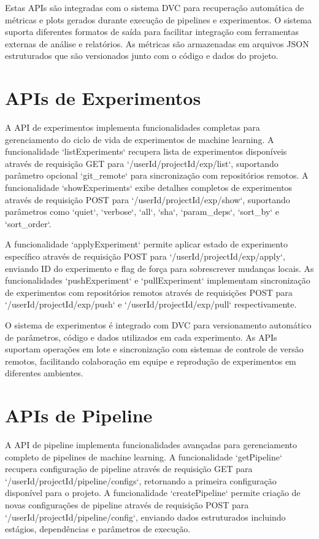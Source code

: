 \documentclass[12pt,a4paper]{article}
\begin{document}
Estas APIs são integradas com o sistema DVC para recuperação automática de métricas e plots gerados durante execução de pipelines e experimentos. O sistema suporta diferentes formatos de saída para facilitar integração com ferramentas externas de análise e relatórios. As métricas são armazenadas em arquivos JSON estruturados que são versionados junto com o código e dados do projeto.

\section{APIs de Experimentos}

A API de experimentos implementa funcionalidades completas para gerenciamento do ciclo de vida de experimentos de machine learning. A funcionalidade `listExperiments` recupera lista de experimentos disponíveis através de requisição GET para `/{userId}/{projectId}/exp/list`, suportando parâmetro opcional `git_remote` para sincronização com repositórios remotos. A funcionalidade `showExperiments` exibe detalhes completos de experimentos através de requisição POST para `/{userId}/{projectId}/exp/show`, suportando parâmetros como `quiet`, `verbose`, `all`, `sha`, `param_deps`, `sort_by` e `sort_order`.

A funcionalidade `applyExperiment` permite aplicar estado de experimento específico através de requisição POST para `/{userId}/{projectId}/exp/apply`, enviando ID do experimento e flag de força para sobrescrever mudanças locais. As funcionalidades `pushExperiment` e `pullExperiment` implementam sincronização de experimentos com repositórios remotos através de requisições POST para `/{userId}/{projectId}/exp/push` e `/{userId}/{projectId}/exp/pull` respectivamente.

O sistema de experimentos é integrado com DVC para versionamento automático de parâmetros, código e dados utilizados em cada experimento. As APIs suportam operações em lote e sincronização com sistemas de controle de versão remotos, facilitando colaboração em equipe e reprodução de experimentos em diferentes ambientes.

\section{APIs de Pipeline}

A API de pipeline implementa funcionalidades avançadas para gerenciamento completo de pipelines de machine learning. A funcionalidade `getPipeline` recupera configuração de pipeline através de requisição GET para `/{userId}/{projectId}/pipeline/configs`, retornando a primeira configuração disponível para o projeto. A funcionalidade `createPipeline` permite criação de novas configurações de pipeline através de requisição POST para `/{userId}/{projectId}/pipeline/config`, enviando dados estruturados incluindo estágios, dependências e parâmetros de execução.
\end{document}
